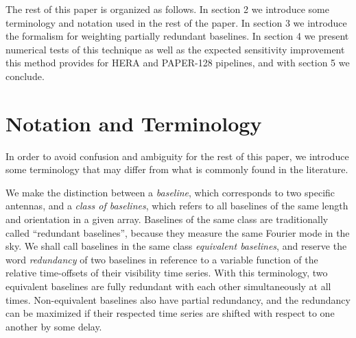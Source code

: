 \documentclass[twocolumn,apj,numberedappendix]{emulateapj}
\renewcommand\[{\begin{equation}}
\renewcommand\]{\end{equation}}
\begin{document}



The rest of this paper is organized as follows. In section 2 we introduce some terminology and notation used in the rest of the paper. In section
3 we introduce the formalism for weighting partially redundant baselines.
In section 4 we present numerical tests of
this technique as well as the expected sensitivity improvement
 this method provides for HERA and PAPER-128 pipelines, and with section 5 we conclude. 

\section{Notation and Terminology}

In order to avoid confusion and ambiguity for the rest of this paper, we
introduce some terminology that may differ from what is commonly found in the literature. 

We make the distinction between a \textit{baseline}, which corresponds to two specific antennas, and a \textit{class of baselines}, which refers to all baselines of the same length and orientation in a given array. 
Baselines of the same class are traditionally called
``redundant baselines'', because they measure the same Fourier mode
in the sky.  We shall call baselines in the same class \textit{equivalent baselines}, and reserve the word \textit{redundancy} of two baselines in reference to a variable function of the relative time-offsets of their visibility time series. With this terminology, two equivalent
baselines are fully redundant with each other simultaneously at all
times. Non-equivalent baselines also have partial redundancy, and the redundancy can be maximized if their
respected time series are shifted with respect to one another by some delay. 
\end{document}
